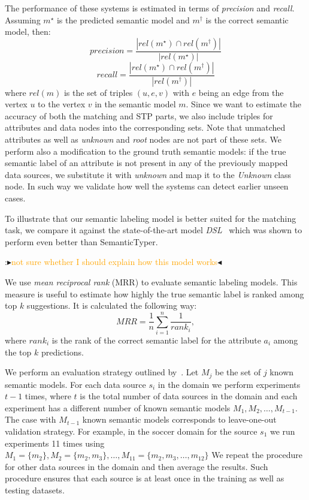 \documentclass[letterpaper]{article} %
\newcommand{\authornote}[3]{
  {\fbox{\sc 
  #1}:$\blacktriangleright$\textcolor{#2}{\small{#3}}$\blacktriangleleft$}%
}
\newcommand{\npr}[1]{\authornote{NPR}{orange}{#1}}
\begin{document}
The performance of these systems is estimated in terms of \emph{precision} and \emph{recall}.
Assuming $m^\star$ is the predicted semantic model and $m^\dag$ is the correct semantic model, then:
$$precision = \frac{|rel(m^\star)\cap rel(m^\dag)|}{|rel(m^\star)|}$$
$$recall = \frac{|rel(m^\star)\cap rel(m^\dag)|}{|rel(m^\dag)|}$$
where $rel(m)$ is the set of triples $(u,e,v)$ with $e$ being an edge from the vertex $u$ to the vertex $v$ in the semantic model $m$.
Since we want to estimate the accuracy of both the matching and STP parts,
we also include triples for attributes and data nodes into the corresponding sets.
Note that unmatched attributes as well as \emph{unknown} and \emph{root} nodes are not part of these sets.
We perform also a modification to the ground truth semantic models:
if the true semantic label of an attribute is not present in any of the previously mapped data sources,
we substitute it with \emph{unknown} and map it to the \emph{Unknown} class node.
In such way we validate how well the systems can detect earlier unseen cases.

To illustrate that our semantic labeling model is better suited for the
matching task, we compare it against the state-of-the-art model \emph{DSL}~\cite{Pham:semantic} which was shown to perform even better than SemanticTyper. 
\npr{not sure whether I should explain how this model works}
We use \emph{mean reciprocal rank} (MRR) to evaluate semantic labeling models.
This measure is useful to estimate how highly the true semantic label is ranked among top $k$ suggestions.
It is calculated the following way:
$$MRR = \frac{1}{n}\sum_{i=1}^{n}{\frac{1}{rank_i}},$$
where $rank_i$ is the rank of the correct semantic label for the attribute $a_i$ among the top $k$ predictions.


We perform an evaluation strategy outlined by~\cite{taheriyan2016learning}.
Let $M_j$ be the set of $j$ known semantic models.
For each data source $s_i$ in the domain we perform experiments $t-1$ times,
where $t$ is the total number of data sources in the domain and each experiment has a different number of known semantic models $M_1, M_2, \ldots, M_{t-1}$.
The case with $M_{t-1}$ known semantic models corresponds to leave-one-out validation strategy. 
For example, in the soccer domain for the source $s_1$ we run experiments 11 times using $M_1=\{m_2\}, M_2=\{m_2, m_3\}, \ldots, M_{11}=\{m_2, m_3, \ldots, m_{12}\}$
We repeat the procedure for other data sources in the domain and then average the results.
Such procedure ensures that each source is at least once in the training as well as testing datasets.
\end{document}
